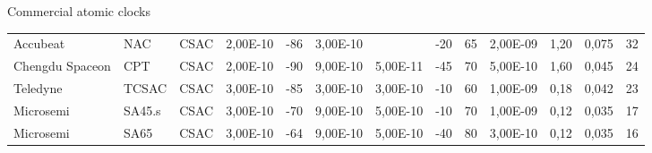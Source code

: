 \begin{frame}{Commercial atomic clocks}
\begin{table}
{\begin{tabular}{ll|lllllllllll}
                Accubeat        & NAC              & CSAC          & 2,00E-10      & -86                    & 3,00E-10       & ~                & -20                    & 65                     & 2,00E-09        & 1,20           & 0,075           & 32                      \\
                Chengdu Spaceon & CPT              & CSAC          & 2,00E-10      & -90                    & 9,00E-10       & 5,00E-11         & -45                    & 70                     & 5,00E-10        & 1,60           & 0,045           & 24                      \\
                Teledyne        & TCSAC            & CSAC          & 3,00E-10      & -85                    & 3,00E-10       & 3,00E-10         & -10                    & 60                     & 1,00E-09        & 0,18           & 0,042           & 23                      \\
                Microsemi       & SA45.s           & CSAC          & 3,00E-10      & -70                    & 9,00E-10       & 5,00E-10         & -10                    & 70                     & 1,00E-09        & 0,12           & 0,035           & 17                      \\
                Microsemi       & SA65             & CSAC          & 3,00E-10      & -64                    & 9,00E-10       & 5,00E-10         & -40                    & 80                     & 3,00E-10        & 0,12           & 0,035           & 16                      \\
                \hline
            \end{tabular}
        }
    \end{table}


\end{frame}